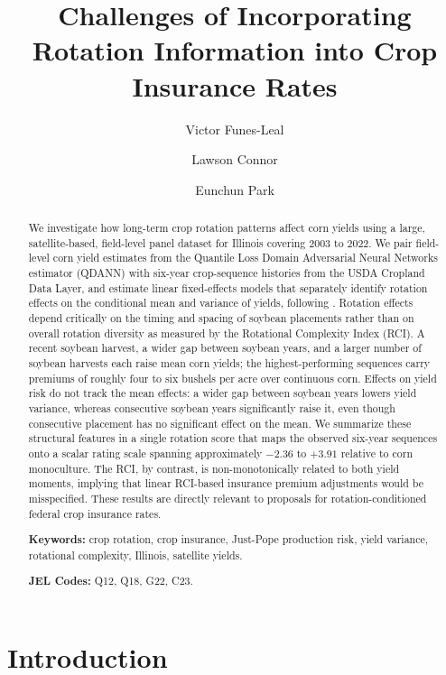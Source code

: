 \documentclass[12pt,letterpaper]{article}
\title{Challenges of Incorporating Rotation Information into Crop Insurance Rates}
\author[1]{Victor Funes-Leal}
\author[2]{Lawson Connor}
\author[3]{Eunchun Park}
\affil[1,2,3]{Department of Agricultural Economics and Agribusiness, University of Arkansas}
\date{}
\theoremstyle{remark}
\theoremstyle{remark}
\theoremstyle{plain}
\theoremstyle{definition}
\begin{document}
\maketitle
\begin{abstract}
\noindent
We investigate how long-term crop rotation patterns affect corn yields using a large, satellite-based, field-level panel dataset for Illinois covering 2003 to 2022. We pair field-level corn yield estimates from the Quantile Loss Domain Adversarial Neural Networks estimator (QDANN) with six-year crop-sequence histories from the USDA Cropland Data Layer, and estimate linear fixed-effects models that separately identify rotation effects on the conditional mean and variance of yields, following \citet{Just1979}. Rotation effects depend critically on the timing and spacing of soybean placements rather than on overall rotation diversity as measured by the Rotational Complexity Index (RCI). A recent soybean harvest, a wider gap between soybean years, and a larger number of soybean harvests each raise mean corn yields; the highest-performing sequences carry premiums of roughly four to six bushels per acre over continuous corn. Effects on yield risk do not track the mean effects: a wider gap between soybean years lowers yield variance, whereas consecutive soybean years significantly raise it, even though consecutive placement has no significant effect on the mean. We summarize these structural features in a single rotation score that maps the observed six-year sequences onto a scalar rating scale spanning approximately $-2.36$ to $+3.91$ relative to corn monoculture. The RCI, by contrast, is non-monotonically related to both yield moments, implying that linear RCI-based insurance premium adjustments would be misspecified. These results are directly relevant to proposals for rotation-conditioned federal crop insurance rates.
 
\medskip\noindent
\textbf{Keywords:} crop rotation, crop insurance, Just-Pope production risk, yield variance, rotational complexity, Illinois, satellite yields.
 
\medskip\noindent
\textbf{JEL Codes:} Q12, Q18, G22, C23.
\end{abstract}
 
\newpage
\setcounter{page}{1}
	
\section{\label{sec:intro}Introduction}
\end{document}
